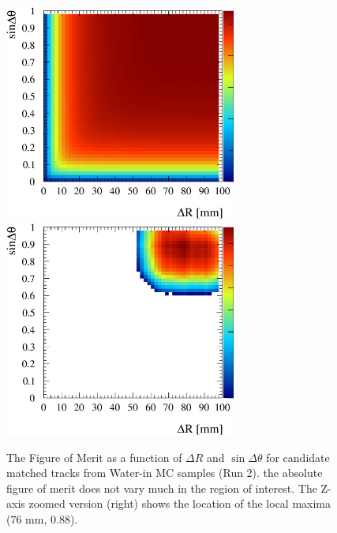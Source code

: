 \begin{figure}
\centering
\includegraphics[width=3in]{Figures/optCut-5E-Run2water-caseA-sinTdR-unzoomZ.eps}
\includegraphics[width=3in]{Figures/optCut-5E-Run2water-caseA-sinTdR-zoomZ.eps}
\caption{The Figure of Merit as a function of $\Delta R$ 
and $\sin\Delta\theta$ for candidate matched tracks from Water-in MC samples 
(Run 2). 
the absolute figure of merit does not vary much in the region of interest. 
The Z-axis zoomed version (right) shows the location of 
the local maxima (76 mm, 0.88).} 
\label{fig:FOMRun2water}
\end{figure}

